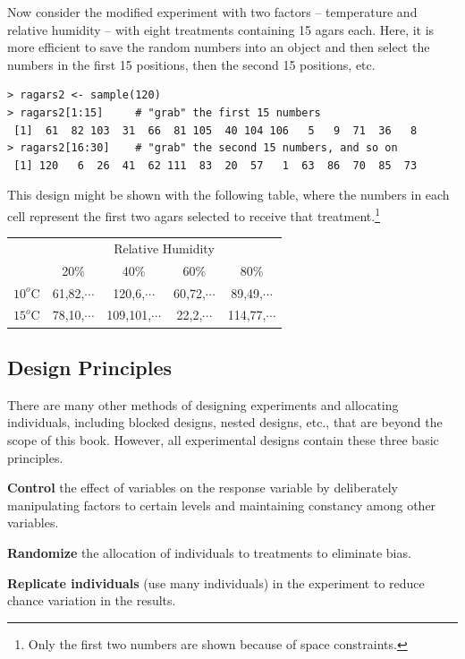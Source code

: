 \documentclass[10pt,openany]{book}\usepackage[]{graphicx}\usepackage[]{color}
\makeatletter
\newenvironment{kframe}{%
 \def\at@end@of@kframe{}%
 \ifinner\ifhmode%
  \def\at@end@of@kframe{\end{minipage}}%
  \begin{minipage}{\columnwidth}%
 \fi\fi%
 \def\FrameCommand##1{\hskip\@totalleftmargin \hskip-\fboxsep
 \colorbox{shadecolor}{##1}\hskip-\fboxsep
     \hskip-\linewidth \hskip-\@totalleftmargin \hskip\columnwidth}%
 \MakeFramed {\advance\hsize-\width
   \@totalleftmargin\z@ \linewidth\hsize
   \@setminipage}}%
 {\par\unskip\endMakeFramed%
 \at@end@of@kframe}
\newenvironment{knitrout}{}{} %
\makeatother
\begin{document}
Now consider the modified experiment with two factors -- temperature and relative humidity -- with eight treatments containing 15 agars each.  Here, it is more efficient to save the random numbers into an object and then select the numbers in the first 15 positions, then the second 15 positions, etc.
\begin{knitrout}
\color{fgcolor}\begin{kframe}
\begin{verbatim}
> ragars2 <- sample(120)
> ragars2[1:15]     # "grab" the first 15 numbers
 [1]  61  82 103  31  66  81 105  40 104 106   5   9  71  36   8
> ragars2[16:30]    # "grab" the second 15 numbers, and so on
 [1] 120   6  26  41  62 111  83  20  57   1  63  86  70  85  73
\end{verbatim}
\end{kframe}
\end{knitrout}

This design might be shown with the following table, where the numbers in each cell represent the first two agars selected to receive that treatment.\footnote{Only the first two numbers are shown because of space constraints.}

\begin{center}
\begin{tabular}{cc|c|c|c}
 & \multicolumn{4}{c}{Relative Humidity} \\
\cline{2-5}
 & 20\% & 40\% & 60\% & 80\% \\
\cline{2-5}
\multicolumn{1}{c|}{$10^{o}$C} & 61,82,$\cdots$ & 120,6,$\cdots$ & 60,72,$\cdots$ & \multicolumn{1}{c|}{89,49,$\cdots$} \\
\hline
\multicolumn{1}{c|}{$15^{o}$C} & 78,10,$\cdots$ & 109,101,$\cdots$ & 22,2,$\cdots$ & \multicolumn{1}{c|}{114,77,$\cdots$} \\
\cline{2-5}
\end{tabular}
\end{center}



\subsection{Design Principles}
There are many other methods of designing experiments and allocating individuals, including blocked designs, nested designs, etc., that are beyond the scope of this book.  However, all experimental designs contain these three basic principles.
\begin{Enumerate}
  \item \textbf{Control} the effect of variables on the response variable by deliberately manipulating factors to certain levels and maintaining constancy among other variables.
  \item \textbf{Randomize} the allocation of individuals to treatments to eliminate bias.
  \item \textbf{Replicate individuals} (use many individuals) in the experiment to reduce chance variation in the results.
\end{Enumerate}
\end{document}
